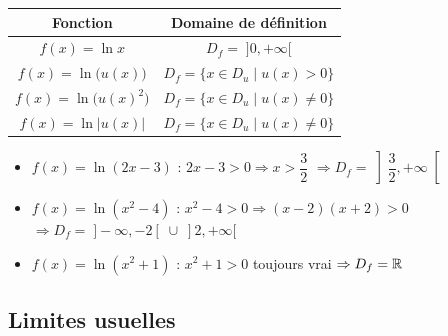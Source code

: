 \begin{propriete}
  \bigskip
  \begin{center}
  \renewcommand{\arraystretch}{2}
  \begin{tabular}{|c|c|}
    \hline
    \textbf{\color{navy}Fonction}
      & \textbf{\color{navy}Domaine de d\'{e}finition} \\
    \hline\hline
    $f(x) = \ln x$
      & $D_f = \;]0,+\infty[$ \\
    \hline
    $f(x) = \ln\bigl(u(x)\bigr)$
      & $D_f = \{x \in D_u \mid u(x) > 0\}$ \\
    \hline
    $f(x) = \ln\bigl(u(x)^2\bigr)$
      & $D_f = \{x \in D_u \mid u(x) \neq 0\}$ \\
    \hline
    $f(x) = \ln\bigl|u(x)\bigr|$
      & $D_f = \{x \in D_u \mid u(x) \neq 0\}$ \\
    \hline
  \end{tabular}
  \end{center}
\end{propriete}

\begin{exemple}
  \begin{itemize}
    \item $f(x) = \ln(2x - 3)$ :
    \quad $2x - 3 > 0 \Rightarrow x > \dfrac{3}{2}$
    \quad $\Rightarrow D_f = \left]\dfrac{3}{2},+\infty\right[$

    \medskip
    \item $f(x) = \ln(x^2 - 4)$ :
    \quad $x^2 - 4 > 0 \Rightarrow (x-2)(x+2) > 0$
    \quad $\Rightarrow D_f = \;]-\infty,-2[\;\cup\;]2,+\infty[$

    \medskip
    \item $f(x) = \ln(x^2 + 1)$ :
    \quad $x^2 + 1 > 0$ toujours vrai
    \quad $\Rightarrow D_f = \mathbb{R}$
  \end{itemize}
\end{exemple}

\subsection{Limites usuelles}

